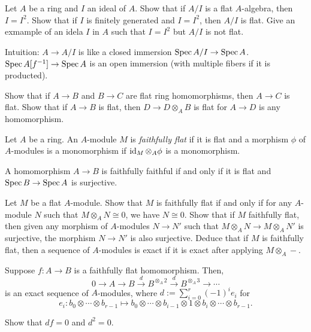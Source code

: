 \documentclass{../../../small}
\begin{document}
\begin{exe*}
Let $A$ be a ring and $I$ an ideal of $A$.
Show that if $A/I$ is a flat $A$-algebra, then $I=I^2$.
Show that if $I$ is finitely generated and $I=I^2$, then $A/I$ is flat.
Give an exmample of an idela $I$ in $A$ such that $I=I^2$ but $A/I$ is not flat.

Intuition: $A\to A/I$ is like a closed immersion $\operatorname{Spec} A/I\to\operatorname{Spec} A$.
$\operatorname{Spec} A[f^{-1}]\to\operatorname{Spec} A$ is an open immersion (with multiple fibers if it is producted).
\end{exe*}

\begin{exe*}
Show that if $A\to B$ and $B\to C$ are flat ring homomorphisms, then $A\to C$ is flat.
Show that if $A\to B$ is flat, then $D\to D\otimes_AB$ is flat for $A\to D$ is any homomorphism.
\end{exe*}

\begin{defn*}
Let $A$ be a ring.
An $A$-module $M$ is \emph{faithfully flat} if it is flat and a morphism $\phi$ of $A$-modules is a monomorphism if $\operatorname{id}_M\otimes_A\phi$ is a monomorphism.
\end{defn*}

\begin{ex*}
A homomorphism $A\to B$ is faithfully faithful if and only if it is flat and $\operatorname{Spec} B\to\operatorname{Spec} A$ is surjective.
\end{ex*}
\begin{exe*}
Let $M$ be a flat $A$-module.
Show that $M$ is faithfully flat if and only if for any $A$-module $N$ such that $M\otimes_AN\cong0$, we have $N\cong0$.
Show that if $M$ faithfully flat, then given any morphism of $A$-modules $N\to N'$ such that $M\otimes_AN\to M\otimes_AN'$ is surjective, the morphism $N\to N'$ is also surjective.
Deduce that if $M$ is faithfully flat, then a sequence of $A$-modules is exact if it is exact after applying $M\otimes_A-$.
\end{exe*}

\begin{thm*}[Milne, I.2.17]
Suppose $f:A\to B$ is a faithfully flat homomorphism.
Then,
\[0\to A\to B\xrightarrow{d}B^{\otimes_A2}\xrightarrow{d}B^{\otimes_A3}\to\cdots\]
is an exact sequence of $A$-modules, where $d:=\sum_{i=0}^r(-1)^ie_i$ for
\[e_i:b_0\otimes\cdots\otimes b_{r-1}\mapsto b_0\otimes\cdots\otimes b_{i-1}\otimes1\otimes b_i\otimes\cdots\otimes b_{r-1}.\]
\end{thm*}

\begin{exe*}
Show that $df=0$ and $d^2=0$.
\end{exe*}
\end{document}
